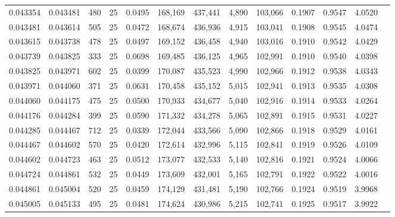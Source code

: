 \begin{tabular}{rrrrrrrrrrrrr}
0.043354 & 0.043481 &   480 &  25 &                                     0.0495 & 168,169 & 437,441 &   4,890 & 103,066 & 0.1907 & 0.9547 & 4.0520 \\
0.043481 & 0.043614 &   505 &  25 &                                     0.0472 & 168,674 & 436,936 &   4,915 & 103,041 & 0.1908 & 0.9545 & 4.0474 \\
0.043615 & 0.043738 &   478 &  25 &                                     0.0497 & 169,152 & 436,458 &   4,940 & 103,016 & 0.1910 & 0.9542 & 4.0429 \\
0.043739 & 0.043825 &   333 &  25 &                                     0.0698 & 169,485 & 436,125 &   4,965 & 102,991 & 0.1910 & 0.9540 & 4.0398 \\
0.043825 & 0.043971 &   602 &  25 &                                     0.0399 & 170,087 & 435,523 &   4,990 & 102,966 & 0.1912 & 0.9538 & 4.0343 \\
0.043971 & 0.044060 &   371 &  25 &                                     0.0631 & 170,458 & 435,152 &   5,015 & 102,941 & 0.1913 & 0.9535 & 4.0308 \\
0.044060 & 0.044175 &   475 &  25 &                                     0.0500 & 170,933 & 434,677 &   5,040 & 102,916 & 0.1914 & 0.9533 & 4.0264 \\
0.044176 & 0.044284 &   399 &  25 &                                     0.0590 & 171,332 & 434,278 &   5,065 & 102,891 & 0.1915 & 0.9531 & 4.0227 \\
0.044285 & 0.044467 &   712 &  25 &                                     0.0339 & 172,044 & 433,566 &   5,090 & 102,866 & 0.1918 & 0.9529 & 4.0161 \\
0.044467 & 0.044602 &   570 &  25 &                                     0.0420 & 172,614 & 432,996 &   5,115 & 102,841 & 0.1919 & 0.9526 & 4.0109 \\
0.044602 & 0.044723 &   463 &  25 &                                     0.0512 & 173,077 & 432,533 &   5,140 & 102,816 & 0.1921 & 0.9524 & 4.0066 \\
0.044724 & 0.044861 &   532 &  25 &                                     0.0449 & 173,609 & 432,001 &   5,165 & 102,791 & 0.1922 & 0.9522 & 4.0016 \\
0.044861 & 0.045004 &   520 &  25 &                                     0.0459 & 174,129 & 431,481 &   5,190 & 102,766 & 0.1924 & 0.9519 & 3.9968 \\
0.045005 & 0.045133 &   495 &  25 &                                     0.0481 & 174,624 & 430,986 &   5,215 & 102,741 & 0.1925 & 0.9517 & 3.9922 \\

\end{tabular}
